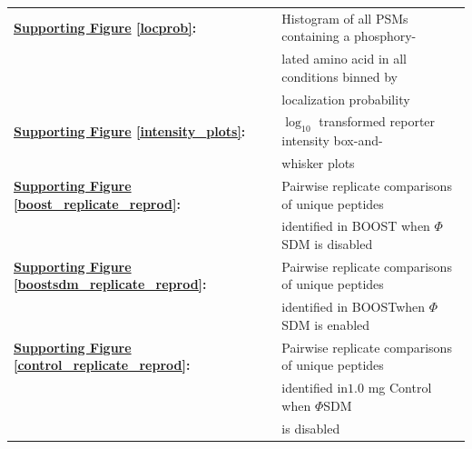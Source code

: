 \documentclass[journal=jprobs,manuscript=article]{achemso}
\begin{document}
\begin{table}[h!]
    \begin{tabular}{ll}


        \textbf{\hyperref[locprob]{Supporting Figure} \ref{locprob}:} & Histogram of all PSMs containing a phosphory- \\
                                                                                                                & lated amino acid in all conditions binned by \\
                                                                                                                & localization probability \\

        \textbf{\hyperref[intensity_plots]{Supporting Figure} \ref{intensity_plots}:} & $\log_{10}$ transformed reporter intensity box-and- \\
                                                                                                                                   & whisker plots \\
        
        \textbf{\hyperref[boost_replicate_reprod]{Supporting Figure} \ref{boost_replicate_reprod}:} & Pairwise replicate comparisons of unique peptides  \\
                                                                                                                                                                    &  identified in BOOST when $\Phi$SDM is disabled \\

        \textbf{\hyperref[boostsdm_replicate_reprod]{Supporting Figure} \ref{boostsdm_replicate_reprod}:} & Pairwise replicate comparisons of unique peptides  \\
                                                                                                                                                                    &  identified in BOOSTwhen $\Phi$SDM is enabled \\

        \textbf{\hyperref[control_replicate_reprod]{Supporting Figure} \ref{control_replicate_reprod}:} & Pairwise replicate comparisons of unique peptides  \\
                                                                                                                                                                    &  identified in$1.0$ mg Control when $\Phi$SDM\\
                                                                                                                                                                    &  is disabled \\


\end{tabular}
\end{table}
\end{document}
